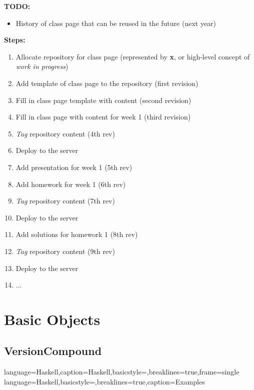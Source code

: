 \documentclass[11pt]{article}
\begin{document}
\textbf{TODO:}
\begin{itemize}
\item History of class page that can be reused in the future (next year)
\end{itemize}

\textbf{Steps:}
\begin{enumerate}
\item Allocate repository for class page (represented by \textbf{x}, or high-level concept of \textit{work in progress})
\item Add template of class page to the repository (first revision)
\item Fill in class page template with content (second revision)
\item Fill in class page with content for week 1 (third revision)
\item \textit{Tag} repository content (4th rev)
\item Deploy to the server
\item Add presentation for week 1 (5th rev)
\item Add homework for week 1 (6th rev)
\item \textit{Tag} repository content (7th rev)
\item Deploy to the server
\item Add solutions for homework 1 (8th rev)
\item \textit{Tag} repository content (9th rev)
\item Deploy to the server
\item ...
\end{enumerate}



\section{Basic Objects}
\label{sec:objects}


\subsection{VersionCompound}
{
	language=Haskell,caption=Haskell,basicstyle=\footnotesize\ttfamily,breaklines=true,frame=single
}
{
	language=Haskell,basicstyle=\footnotesize\ttfamily,breaklines=true,caption=Examples
}
\lstset{style=Haskell}          %
\end{document}
